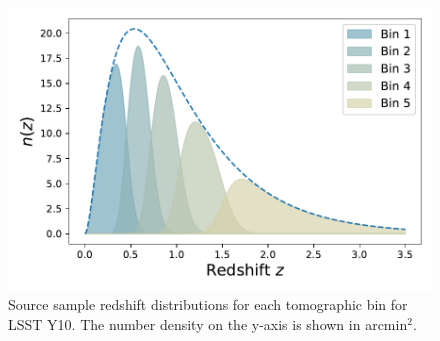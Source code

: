 \documentclass{aa}
\begin{document}
\begin{figure}
    \centering
    \includegraphics[width=\columnwidth]{figures/redshift_distribution_light.pdf}
    \caption{
     Source sample redshift distributions for each tomographic bin for LSST Y10. The number density on the y-axis is shown in arcmin$^2$.
    }
     \label{fig:redshift_distribution}
\end{figure}
\end{document}

